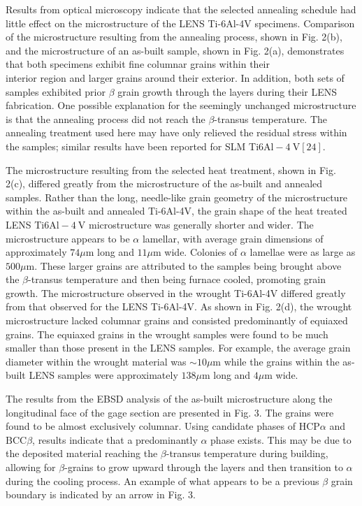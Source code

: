 \documentclass[10pt]{article}
\begin{document}
Results from optical microscopy indicate that the selected annealing schedule had little effect on the microstructure of the LENS Ti-6Al-4V specimens. Comparison of the microstructure resulting from the annealing process, shown in Fig. 2(b), and the microstructure of an as-built sample, shown in Fig. 2(a), demonstrates that both specimens exhibit fine columnar grains within their\\
interior region and larger grains around their exterior. In addition, both sets of samples exhibited prior $\beta$ grain growth through the layers during their LENS fabrication. One possible explanation for the seemingly unchanged microstructure is that the annealing process did not reach the $\beta$-transus temperature. The annealing treatment used here may have only relieved the residual stress within the samples; similar results have been reported for SLM Ti$6 \mathrm{Al}-4 \mathrm{~V}[24]$.

The microstructure resulting from the selected heat treatment, shown in Fig. 2(c), differed greatly from the microstructure of the as-built and annealed samples. Rather than the long, needle-like grain geometry of the microstructure within the as-built and annealed Ti-6Al-4V, the grain shape of the heat treated LENS Ti$6 \mathrm{Al}-4 \mathrm{~V}$ microstructure was generally shorter and wider. The microstructure appears to be $\alpha$ lamellar, with average grain dimensions of approximately $74 \mu \mathrm{m}$ long and $11 \mu \mathrm{m}$ wide. Colonies of $\alpha$ lamellae were as large as $500 \mu \mathrm{m}$. These larger grains are attributed to the samples being brought above the $\beta$-transus temperature and then being furnace cooled, promoting grain growth. The microstructure observed in the wrought Ti-6Al-4V differed greatly from that observed for the LENS Ti-6Al-4V. As shown in Fig. 2(d), the wrought microstructure lacked columnar grains and consisted predominantly of equiaxed grains. The equiaxed grains in the wrought samples were found to be much smaller than those present in the LENS samples. For example, the average grain diameter within the wrought material was $\sim 10 \mu \mathrm{m}$ while the grains within the as-built LENS samples were approximately $138 \mu \mathrm{m}$ long and $4 \mu \mathrm{m}$ wide.

The results from the EBSD analysis of the as-built microstructure along the longitudinal face of the gage section are presented in Fig. 3. The grains were found to be almost exclusively columnar. Using candidate phases of $\mathrm{HCP} \alpha$ and $\mathrm{BCC} \beta$, results indicate that a predominantly $\alpha$ phase exists. This may be due to the deposited material reaching the $\beta$-transus temperature during building, allowing for $\beta$-grains to grow upward through the layers and then transition to $\alpha$ during the cooling process. An example of what appears to be a previous $\beta$ grain boundary is indicated by an arrow in Fig. 3.
\end{document}
